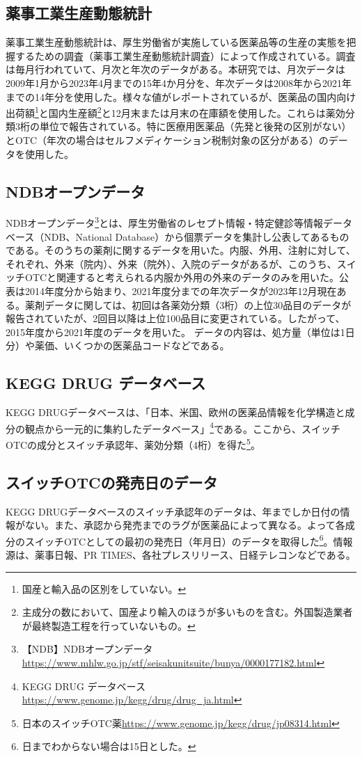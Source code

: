 \documentclass[a4paper,11pt,uplatex]{jsarticle}
\theoremstyle{definition}
\begin{document}
\subsection{薬事工業生産動態統計}
薬事工業生産動態統計は、厚生労働省が実施している医薬品等の生産の実態を把握するための調査（薬事工業生産動態統計調査）によって作成されている。調査は毎月行われていて、月次と年次のデータがある。本研究では、月次データは2009年1月から2023年4月までの15年4か月分を、年次データは2008年から2021年までの14年分を使用した。様々な値がレポートされているが、医薬品の国内向け出荷額\footnote{国産と輸入品の区別をしていない。}と国内生産額\footnote{主成分の数において、国産より輸入のほうが多いものを含む。外国製造業者が最終製造工程を行っていないもの。}と12月末または月末の在庫額を使用した。これらは薬効分類3桁の単位で報告されている。特に医療用医薬品（先発と後発の区別がない）とOTC（年次の場合はセルフメディケーション税制対象の区分がある）のデータを使用した。
\subsection{NDBオープンデータ}
NDBオープンデータ\footnote{【NDB】NDBオープンデータ\url{https://www.mhlw.go.jp/stf/seisakunitsuite/bunya/0000177182.html}}とは、厚生労働省のレセプト情報・特定健診等情報データベース（NDB、National Database）から個票データを集計し公表してあるものである。そのうちの薬剤に関するデータを用いた。内服、外用、注射に対して、それぞれ、外来（院内）、外来（院外）、入院のデータがあるが、このうち、スイッチOTCと関連すると考えられる内服か外用の外来のデータのみを用いた。公表は2014年度分から始まり、2021年度分までの年次データが2023年12月現在ある。薬剤データに関しては、初回は各薬効分類（3桁）の上位30品目のデータが報告されていたが、2回目以降は上位100品目に変更されている。したがって、2015年度から2021年度のデータを用いた。 データの内容は、処方量（単位は1日分）や薬価、いくつかの医薬品コードなどである。
\subsection{KEGG DRUG データベース}
KEGG DRUGデータベースは、「日本、米国、欧州の医薬品情報を化学構造と成分の観点から一元的に集約したデータベース」\footnote{KEGG DRUG データベース\url{https://www.genome.jp/kegg/drug/drug_ja.html}}である。ここから、スイッチOTCの成分とスイッチ承認年、薬効分類（4桁）を得た\footnote{ 日本のスイッチOTC薬\url{https://www.genome.jp/kegg/drug/jp08314.html}}。
\subsection{スイッチOTCの発売日のデータ}
KEGG DRUGデータベースのスイッチ承認年のデータは、年までしか日付の情報がない。また、承認から発売までのラグが医薬品によって異なる。よって各成分のスイッチOTCとしての最初の発売日（年月日）のデータを取得した\footnote{日までわからない場合は15日とした。}。情報源は、薬事日報、PR TIMES、各社プレスリリース、日経テレコンなどである。
\end{document}
